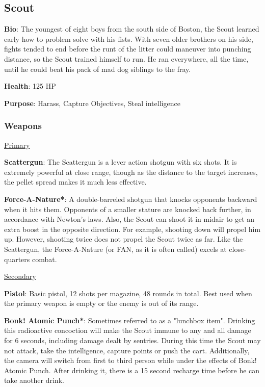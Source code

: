 \subsection{Scout}
{\bf Bio}:
The youngest of eight boys from the south side of Boston, the Scout learned early how to problem solve with his fists. With seven older brothers on his side, fights tended to end before the runt of the litter could maneuver into punching distance, so the Scout trained himself to run. He ran everywhere, all the time, until he could beat his pack of mad dog siblings to the fray.

{\bf Health}: 125 HP

{\bf Purpose}:
Harass, Capture Objectives, Steal intelligence

\subsubsection {Weapons}

\begin {center}
\underline {Primary}
\end {center}

{\bf Scattergun}:  The Scattergun is a lever action shotgun with six shots. It is extremely powerful at close range, though as the distance to the target increases, the pellet spread makes it much less effective.

{\bf Force-A-Nature*}: A double-barreled shotgun that knocks opponents backward when it hits them.  Opponents of a smaller stature are knocked back further, in accordance with Newton's laws.  Also, the Scout can shoot it in midair to get an extra boost in the opposite direction.  For example, shooting down will propel him up. However, shooting twice does not propel the Scout twice as far. Like the Scattergun, the Force-A-Nature (or FAN, as it is often called) excels at close-quarters combat.


\begin {center}
\underline {Secondary}
\end {center}

{\bf Pistol}: Basic pistol, 12 shots per magazine, 48 rounds in total. Best used when the primary weapon is empty or the enemy is out of its range.

{\bf Bonk! Atomic Punch*}: Sometimes referred to as a "lunchbox item". Drinking this radioactive concoction will make the Scout immune to any and all damage for 6 seconds, including damage dealt by sentries. During this time the Scout may not attack, take the intelligence, capture points or push the cart. Additionally, the camera will switch from first to third person while under the effects of Bonk! Atomic Punch. After drinking it, there is a 15 second recharge time before he can take another drink.

